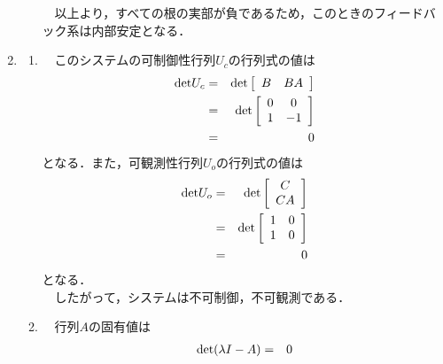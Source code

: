 \documentclass[a4paper,11pt]{jarticle}
\begin{document}
\begin{enumerate}
\begin{enumerate}[(1)]
	 \ \ 以上より，すべての根の実部が負であるため，このときのフィードバック系は内部安定となる．
  \end{enumerate}
 \item
  \begin{enumerate}[(1)]
   \setlength{\leftskip}{2mm}
   \item \ \ このシステムの可制御性行列$ U_c $の行列式の値は
	 \begin{eqnarray}
	  {\rm det} U_c & = & {\rm det} \left[
				      \begin{array}{cc}
				       B & BA \\
				      \end{array}
				      \right] \nonumber \\
	              & = & {\rm det} \left[
				      \begin{array}{cc}
				       0 & 0 \\
				       1 & -1 \\
				      \end{array}
				      \right] \nonumber \\
	              & = & 0
	 \end{eqnarray}
	 となる．また，可観測性行列$ U_o $の行列式の値は
	 \begin{eqnarray}
	  {\rm det} U_o & = & {\rm det} \left[
					\begin{array}{c}
					 C \\
					 CA \\
					\end{array}
					\right] \nonumber \\
	                & = & {\rm det} \left[
					\begin{array}{cc}
					 1 & 0 \\
					 1 & 0 \\
					\end{array}
					\right] \nonumber \\
	                & = & 0
	 \end{eqnarray}
	 となる．\\
	 \ \ したがって，システムは不可制御，不可観測である．
   \item \ \ 行列$ A $の固有値は
	 \begin{eqnarray*}
	  {\rm det} ( \lambda I - A ) & = & 0\\

\end{eqnarray*}
\end{enumerate}
\end{enumerate}
\end{document}
